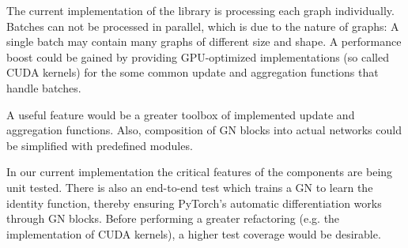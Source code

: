 The current implementation of the library is processing each graph individually. Batches can not be processed in parallel, which is due to the nature of graphs: A single batch may contain many graphs of different size and shape. A performance boost could be gained by providing GPU-optimized implementations (so called CUDA kernels) for the some common update and aggregation functions that handle batches.

A useful feature would be a greater toolbox of implemented update and aggregation functions. Also, composition of GN blocks into actual networks could be simplified with predefined modules.

In our current implementation the critical features of the components are being unit tested. There is also an end-to-end test which trains a GN to learn the identity function, thereby ensuring PyTorch's automatic differentiation works through GN blocks. Before performing a greater refactoring (e.g. the implementation of CUDA kernels), a higher test coverage would be desirable.
